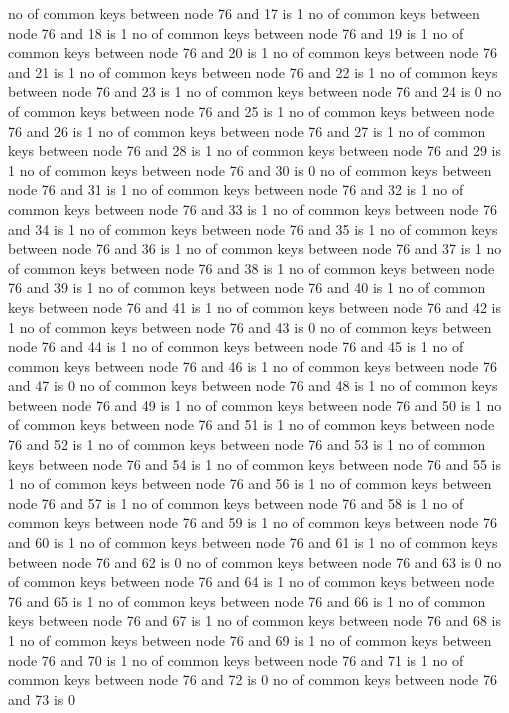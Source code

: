 no of common keys between node 76 and 17 is 1
no of common keys between node 76 and 18 is 1
no of common keys between node 76 and 19 is 1
no of common keys between node 76 and 20 is 1
no of common keys between node 76 and 21 is 1
no of common keys between node 76 and 22 is 1
no of common keys between node 76 and 23 is 1
no of common keys between node 76 and 24 is 0
no of common keys between node 76 and 25 is 1
no of common keys between node 76 and 26 is 1
no of common keys between node 76 and 27 is 1
no of common keys between node 76 and 28 is 1
no of common keys between node 76 and 29 is 1
no of common keys between node 76 and 30 is 0
no of common keys between node 76 and 31 is 1
no of common keys between node 76 and 32 is 1
no of common keys between node 76 and 33 is 1
no of common keys between node 76 and 34 is 1
no of common keys between node 76 and 35 is 1
no of common keys between node 76 and 36 is 1
no of common keys between node 76 and 37 is 1
no of common keys between node 76 and 38 is 1
no of common keys between node 76 and 39 is 1
no of common keys between node 76 and 40 is 1
no of common keys between node 76 and 41 is 1
no of common keys between node 76 and 42 is 1
no of common keys between node 76 and 43 is 0
no of common keys between node 76 and 44 is 1
no of common keys between node 76 and 45 is 1
no of common keys between node 76 and 46 is 1
no of common keys between node 76 and 47 is 0
no of common keys between node 76 and 48 is 1
no of common keys between node 76 and 49 is 1
no of common keys between node 76 and 50 is 1
no of common keys between node 76 and 51 is 1
no of common keys between node 76 and 52 is 1
no of common keys between node 76 and 53 is 1
no of common keys between node 76 and 54 is 1
no of common keys between node 76 and 55 is 1
no of common keys between node 76 and 56 is 1
no of common keys between node 76 and 57 is 1
no of common keys between node 76 and 58 is 1
no of common keys between node 76 and 59 is 1
no of common keys between node 76 and 60 is 1
no of common keys between node 76 and 61 is 1
no of common keys between node 76 and 62 is 0
no of common keys between node 76 and 63 is 0
no of common keys between node 76 and 64 is 1
no of common keys between node 76 and 65 is 1
no of common keys between node 76 and 66 is 1
no of common keys between node 76 and 67 is 1
no of common keys between node 76 and 68 is 1
no of common keys between node 76 and 69 is 1
no of common keys between node 76 and 70 is 1
no of common keys between node 76 and 71 is 1
no of common keys between node 76 and 72 is 0
no of common keys between node 76 and 73 is 0
